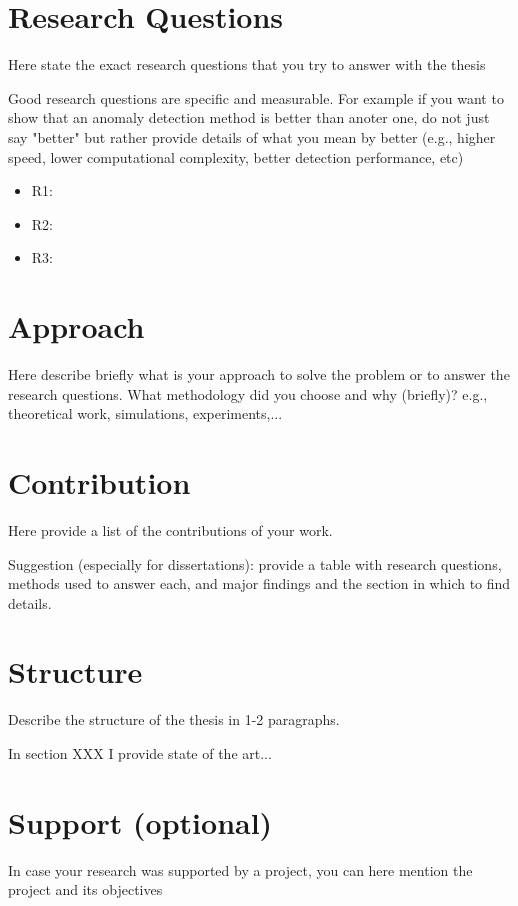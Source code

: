 \section{Research Questions} \label{sect.research_questions}

Here state the exact research questions that you try to answer with the thesis

Good research questions are specific and measurable. For example if you want to show that an anomaly detection method is better than anoter one, do not just say "better" but rather provide details of what you mean by better (e.g., higher speed, lower computational complexity, better detection performance, etc)

\begin{itemize}
	\item R1: 
	\item R2:
	\item R3:
\end{itemize}


\section{Approach} \label{sect.approach}

Here describe briefly what is your approach to solve the problem or to answer the research questions. What methodology did you choose and why (briefly)? e.g., theoretical work, simulations, experiments,...

\section{Contribution} \label{sect.contribution}

Here provide a list of the contributions of your work.

Suggestion (especially for dissertations): provide a table with research questions, methods used to answer each, and major findings and the section in which to find details.

\section{Structure} \label{sect.structure}
Describe the structure of the thesis in 1-2 paragraphs.

In section XXX I provide state of the art...


\section{Support (optional)   } \label{sect.support}
In case your research was supported by a project, you can here mention the project and its objectives

\newpage